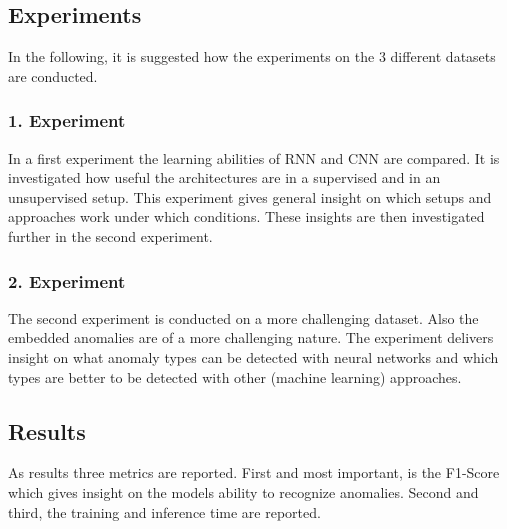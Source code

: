 \subsection{Experiments}
In the following, it is suggested how the experiments on the 3 different datasets are conducted.

\subsubsection{1. Experiment}
In a first experiment the learning abilities of RNN and CNN are compared. It is investigated how useful the architectures are in a supervised and in an unsupervised setup. This experiment gives general insight on which setups and approaches work under which conditions. These insights are then investigated further in the second experiment.

\subsubsection{2. Experiment}
The second experiment is conducted on a more challenging dataset. Also the embedded anomalies are of a more challenging nature. The experiment delivers insight on what anomaly types can be detected with neural networks and which types are better to be detected with other (machine learning) approaches.

\subsection{Results}
As results three metrics are reported. First and most important, is the F1-Score which gives insight on the models ability to recognize anomalies. Second and third, the training and inference time are reported.



 